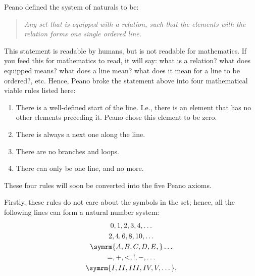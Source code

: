 Peano defined the system of naturals to be:
\begin{quote}
  \emph{Any set that is equipped with a relation, such that the elements with the relation forms
  \emph{one single ordered line}.}
\end{quote}
This statement is readable by humans, but is not readable for mathematics. If you feed this for
mathematics to read, it will say: what is a relation? what does equipped means? what does a line
mean? what does it mean for a line to be ordered?, etc. Hence, Peano broke the statement above into
four mathematical viable rules listed here:
\begin{enumerate}[
  noitemsep, label = \textbf{\textsf{Rule \arabic*)}}, ref = Rule \arabic*, leftmargin = *
]
  \item There is a well-defined start of the line. I.e., there is an element that has no other
        elements preceding it. Peano chose this element to be zero.\label{ite:naturals-rule-1}
  \item There is always a next one along the line.\label{ite:naturals-rule-2}
  \item There are no branches and loops.\label{ite:naturals-rule-3}
  \item There can only be one line, and no more.\label{ite:naturals-rule-4}
\end{enumerate}
These four rules will soon be converted into the five Peano axioms.

Firstly, these rules do not care about the symbols in the set; hence, all the following lines can
form a natural number system:
\begin{gather*}
  0, 1, 2, 3, 4, \dots              \\
  2, 4, 6, 8, 10, \dots             \\
  \symrm{A, B, C, D, E,} \dots      \\
  = , +, < , !, -, \dots            \\
  \symrm{I, II, III, IV, V, \dots},
\end{gather*}

